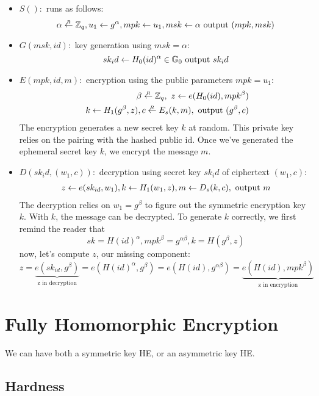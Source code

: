 \begin{itemize}
  \item $S():$ runs as follows:
  $$ \alpha\overset{_R}{\leftarrow} \mathbb{Z}_q, u_1\leftarrow g^\alpha, mpk \leftarrow u_1, msk \leftarrow \alpha 
  \text{ output }(mpk,msk) $$
  \item $G(msk,id):$ key generation using $msk = \alpha$:
  $$ sk_id \leftarrow H_0(id)^\alpha \in \mathbb{G}_0 \text{ output } sk_id$$
  \item $E(mpk, id, m ):$ encryption using the public parameters $mpk=u_1$:
  \begin{align*}\label{lamlam} 
    \beta \getrandom \Z_q,\  z\from e(H_0(id),mpk^\beta) 
    \\ \ 
    k\from H_1(g^\beta,z), c\getrandom E_s(k,m), \text{ output } (g^\beta,c)
  \end{align*}
  The encryption generates a new secret key $k$ at random. This private key relies on the pairing with
  the hashed public id. Once we've generated the ephemeral secret key $k$, we encrypt the message $m$.

  \item $D(sk_id,(w_1,c)):$ decryption using secret key $sk_id$ of ciphertext $(w_1,c)$:
  \begin{align*}
    z \leftarrow  e(sk_{id},w_1), k\leftarrow H_1(w_1, z), m\leftarrow D_s(k,c),
  \text{ output } m
  \end{align*}
  The decryption relies on $w_1=g^\beta$ to figure out the symmetric encryption key $k$.
  With $k$, the message can be decrypted.
  \newline
  To generate $k$ correctly, we first remind the reader that $$sk=H(id)^\alpha, mpk^\beta=g^{\alpha\beta}, k=H(g^\beta,z)$$
  now, let's compute $z$, our missing component:
  $$
  z=\underbrace{e(sk_{id},g^\beta)}_{\text{z in decryption}}=e(H(id)^\alpha,g^\beta)=e(H(id),g^{\alpha\beta})=\underbrace{e(H(id),mpk^\beta)}_{\text{z in encryption}}
  $$
\end{itemize}


\chapter{Fully Homomorphic Encryption}

We can have both a symmetric key HE, or an asymmetric key HE. 

\section{Hardness}

